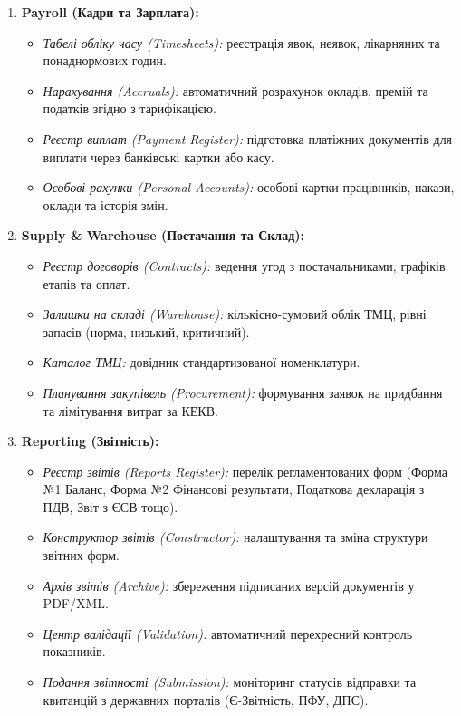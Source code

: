 \documentclass{article}
\begin{document}
\begin{enumerate}
\begin{itemize}
        \item \emph{Головна книга (General Ledger):} оборотно-сальдова відомість по всіх бухгалтерських рахунках.
        \item \emph{Баланс (Balance Sheet):} формування активів та пасивів підприємства.
        \item \emph{Аналітичний облік (Analytical Accounting):} субконто та багатовимірні розрізи.
    \end{itemize}
    \item \textbf{Payroll (Кадри та Зарплата):}
    \begin{itemize}
        \item \emph{Табелі обліку часу (Timesheets):} реєстрація явок, неявок, лікарняних та понаднормових годин.
        \item \emph{Нарахування (Accruals):} автоматичний розрахунок окладів, премій та податків згідно з тарифікацією.
        \item \emph{Реєстр виплат (Payment Register):} підготовка платіжних документів для виплати через банківські картки або касу.
        \item \emph{Особові рахунки (Personal Accounts):} особові картки працівників, накази, оклади та історія змін.
    \end{itemize}
    \item \textbf{Supply \& Warehouse (Постачання та Склад):}
    \begin{itemize}
        \item \emph{Реєстр договорів (Contracts):} ведення угод з постачальниками, графіків етапів та оплат.
        \item \emph{Залишки на складі (Warehouse):} кількісно-сумовий облік ТМЦ, рівні запасів (норма, низький, критичний).
        \item \emph{Каталог ТМЦ:} довідник стандартизованої номенклатури.
        \item \emph{Планування закупівель (Procurement):} формування заявок на придбання та лімітування витрат за КЕКВ.
    \end{itemize}
    \item \textbf{Reporting (Звітність):}
    \begin{itemize}
        \item \emph{Реєстр звітів (Reports Register):} перелік регламентованих форм (Форма №1 Баланс, Форма №2 Фінансові результати, Податкова декларація з ПДВ, Звіт з ЄСВ тощо).
        \item \emph{Конструктор звітів (Constructor):} налаштування та зміна структури звітних форм.
        \item \emph{Архів звітів (Archive):} збереження підписаних версій документів у PDF/XML.
        \item \emph{Центр валідації (Validation):} автоматичний перехресний контроль показників.
        \item \emph{Подання звітності (Submission):} моніторинг статусів відправки та квитанцій з державних порталів (Є-Звітність, ПФУ, ДПС).
    \end{itemize}
\end{enumerate}
\end{document}

